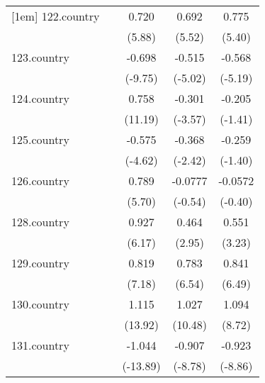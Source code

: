 {\begin{tabular}{l*{4}{c}}
[1em]
122.country &                     &       0.720\sym{***}&       0.692\sym{***}&       0.775\sym{***}\\
            &                     &      (5.88)         &      (5.52)         &      (5.40)         \\
[1em]
123.country &                     &      -0.698\sym{***}&      -0.515\sym{***}&      -0.568\sym{***}\\
            &                     &     (-9.75)         &     (-5.02)         &     (-5.19)         \\
[1em]
124.country &                     &       0.758\sym{***}&      -0.301\sym{***}&      -0.205         \\
            &                     &     (11.19)         &     (-3.57)         &     (-1.41)         \\
[1em]
125.country &                     &      -0.575\sym{***}&      -0.368\sym{*}  &      -0.259         \\
            &                     &     (-4.62)         &     (-2.42)         &     (-1.40)         \\
[1em]
126.country &                     &       0.789\sym{***}&     -0.0777         &     -0.0572         \\
            &                     &      (5.70)         &     (-0.54)         &     (-0.40)         \\
[1em]
128.country &                     &       0.927\sym{***}&       0.464\sym{**} &       0.551\sym{**} \\
            &                     &      (6.17)         &      (2.95)         &      (3.23)         \\
[1em]
129.country &                     &       0.819\sym{***}&       0.783\sym{***}&       0.841\sym{***}\\
            &                     &      (7.18)         &      (6.54)         &      (6.49)         \\
[1em]
130.country &                     &       1.115\sym{***}&       1.027\sym{***}&       1.094\sym{***}\\
            &                     &     (13.92)         &     (10.48)         &      (8.72)         \\
[1em]
131.country &                     &      -1.044\sym{***}&      -0.907\sym{***}&      -0.923\sym{***}\\
            &                     &    (-13.89)         &     (-8.78)         &     (-8.86)         \\

\end{tabular}}
